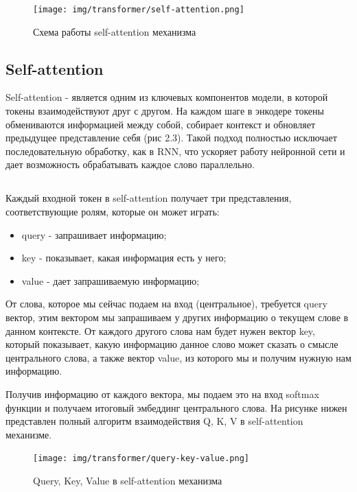 \documentclass[PMI,VKR]{HSEUniversity}
\begin{document}
\begin{figure}[h]
    \centering
    \texttt{[image: img/transformer/self-attention.png]}
    \caption{Схема работы self-attention механизма}
\end{figure}

\subsection{Self-attention}

Self-attention - является одним из ключевых компонентов модели, в которой токены взаимодействуют друг с другом. На каждом шаге в энкодере токены обмениваются информацией между собой, собирает контекст и обновляет предыдущее представление себя (рис 2.3). Такой подход полностью исключает последовательную обработку, как в RNN, что ускоряет работу нейронной сети и дает возможность обрабатывать каждое слово параллельно.

\newpage
\subsection{}

Каждый входной токен в self-attention получает три представления, соответствующие ролям, которые он может играть:
\begin{itemize}
    \item query - запрашивает информацию;
    \item key - показывает, какая информация есть у него;
    \item value - дает запрашиваемую информацию;
\end{itemize}

От слова, которое мы сейчас подаем на вход (центральное), требуется query вектор, этим вектором мы запрашиваем у других информацию о текущем слове в данном контексте. От каждого другого слова нам будет нужен вектор key, который показывает, какую информацию данное слово может сказать о смысле центрального слова, а также вектор value, из которого мы и получим нужную нам информацию.

Получив информацию от каждого вектора, мы подаем это на вход softmax функции и получаем итоговый эмбеддинг центрального слова.
На рисунке нижен представлен полный алгоритм взаимодействия Q, K, V в self-attention механизме.

\newpage
\begin{figure}[h]
    \centering
    \texttt{[image: img/transformer/query-key-value.png]}
    \caption{Query, Key, Value в self-attention механизма}
\end{figure}
\end{document}
